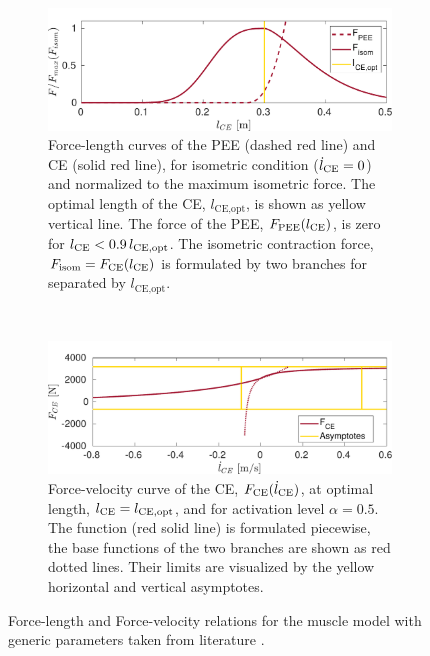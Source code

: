 \begin{figure}%
  \centering%
  \begin{subfigure}[t]{0.9\textwidth}%
    \centering%
    \includegraphics[width=\textwidth]{images/summer_school_study/force_curves_generic_length.pdf}%
    \caption{Force-length curves of the PEE (dashed red line) and CE (solid red line), for isometric condition ($\dot{l}_{\text{CE}}=0$) and normalized to the maximum isometric force. The optimal length of the CE, $l_\text{CE,opt}$, is shown as yellow vertical line. The force of the PEE, $F_\text{PEE}(l_{\text{CE}})$, is zero for $l_{\text{CE}} < 0.9\,l_\text{CE,opt}$. The isometric contraction force, $F_\text{isom} = F_{\text{CE}}(l_{\text{CE}})$ is formulated by two branches for separated by $l_\text{CE,opt}$.}%
    \label{fig:force_curves_generic_length}%
  \end{subfigure}\\[6mm]
  \begin{subfigure}[t]{0.9\textwidth}%
    \centering%
    \includegraphics[width=\textwidth]{images/summer_school_study/force_curves_generic_velocity.pdf}%
    \caption{Force-velocity curve of the CE, $F_{\text{CE}}(\dot{l}_{\text{CE}})$, at optimal length, $l_{\text{CE}}=l_{\text{CE},\text{opt}}$, and for activation level $\alpha=0.5$. The function (red solid line) is formulated piecewise, the base functions of the two branches are shown as red dotted lines. Their limits are visualized by the yellow horizontal and vertical asymptotes.}%
    \label{fig:force_curves_generic_velocity}%
  \end{subfigure}%
  \caption{Force-length and Force-velocity relations for the muscle model with generic parameters taken from literature \cite{Hilltype2014}.}%
  \label{fig:force_curves_generic}%
\end{figure}%

